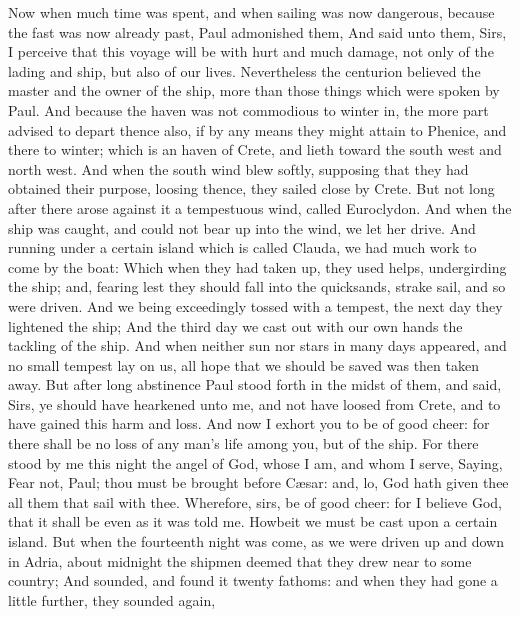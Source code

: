  Now when much time was spent, and when sailing was now
dangerous, because the fast was now already past, Paul admonished them,
 And said unto them, Sirs, I perceive that this voyage will
be with hurt and much damage, not only of the lading and ship, but also
of our lives.  Nevertheless the centurion believed the
master and the owner of the ship, more than those things which were
spoken by Paul.  And because the haven was not commodious
to winter in, the more part advised to depart thence also, if by any
means they might attain to Phenice, and there to winter; which is an
haven of Crete, and lieth toward the south west and north west.
 And when the south wind blew softly, supposing that they
had obtained their purpose, loosing thence, they sailed close by Crete.
 But not long after there arose against it a tempestuous
wind, called Euroclydon.  And when the ship was caught, and
could not bear up into the wind, we let her drive.  And
running under a certain island which is called Clauda, we had much work
to come by the boat:  Which when they had taken up, they
used helps, undergirding the ship; and, fearing lest they should fall
into the quicksands, strake sail, and so were driven.  And
we being exceedingly tossed with a tempest, the next day they lightened
the ship;  And the third day we cast out with our own hands
the tackling of the ship.  And when neither sun nor stars
in many days appeared, and no small tempest lay on us, all hope that we
should be saved was then taken away.  But after long
abstinence Paul stood forth in the midst of them, and said, Sirs, ye
should have hearkened unto me, and not have loosed from Crete, and to
have gained this harm and loss.  And now I exhort you to be
of good cheer: for there shall be no loss of any man's life among you,
but of the ship.  For there stood by me this night the
angel of God, whose I am, and whom I serve,  Saying, Fear
not, Paul; thou must be brought before Cæsar: and, lo, God hath given
thee all them that sail with thee.  Wherefore, sirs, be of
good cheer: for I believe God, that it shall be even as it was told me.
 Howbeit we must be cast upon a certain island.
 But when the fourteenth night was come, as we were driven
up and down in Adria, about midnight the shipmen deemed that they drew
near to some country;  And sounded, and found it twenty
fathoms: and when they had gone a little further, they sounded again,
